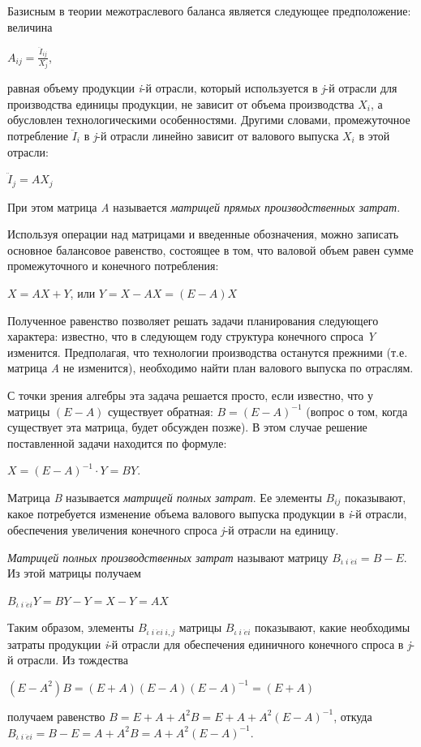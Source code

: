 \documentclass[12pt, 4paper]{book}
\begin{document}
{Базисным в теории межотраслевого баланса является следующее предположение: величина
\begin{center}
	$A_{ij} = \frac{\ddot{I}_{ij}}{X_j}$,
\end{center}
равная объему продукции \textit{i}-й отрасли, который используется в \textit{j}-й отрасли для производства единицы продукции, не зависит от объема производства $X_i$, а обусловлен технологическими особенностями. Другими словами, промежуточное потребление $\ddot{I}_i$ в \textit{j}-й отрасли линейно зависит от валового выпуска $X_i$ в этой отрасли:
\begin{center}
	$\ddot{I}_j = AX_j$
\end{center}
При этом матрица \textit{A} называется \textit{матрицей прямых производственных затрат}.
\par

Используя операции над матрицами и введенные обозначения, можно записать основное балансовое равенство, состоящее в том, что валовой объем равен сумме промежуточного и конечного потребления:
\begin{center}
	$X = AX + Y$, или $Y = X - AX = (E - A)X$
\end{center}
Полученное равенство позволяет решать задачи планирования следующего характера: известно, что в следующем году структура конечного спроса \textit{Y} изменится. Предполагая, что технологии производства останутся прежними (т.е. матрица \textit{A} не изменится), необходимо найти план валового выпуска по отраслям.
\par

С точки зрения алгебры эта задача решается просто, если известно, что у матрицы $(E - A)$ существует обратная: $B = (E - A)^{-1}$ (вопрос о том, когда существует эта матрица, будет обсужден позже). В этом случае решение поставленной задачи находится по формуле:
\begin{center}
	$X = (E - A)^{-1} \cdot Y = BY$.
\end{center}
Матрица \textit{B} называется \textit{матрицей полных затрат}. Ее элементы $B_{ij}$ показывают, какое потребуется изменение объема валового выпуска продукции в \textit{i}-й отрасли, обеспечения увеличения конечного спроса \textit{j}-й отрасли на единицу.  
\par

\textit{Матрицей полных производственных затрат} называют матрицу $B_{\ddot{\iota} \; i \; \ddot{e}i} = B - E$. Из этой матрицы получаем
\begin{center}
	$B_{\ddot{\iota} \; i \; \ddot{e}i}Y = BY - Y = X - Y = AX$
\end{center}
Таким образом, элементы $B_{\ddot{\iota} \; i \; \ddot{e}i \; i,j}$ матрицы $B_{\ddot{\iota} \; i \; \ddot{e}i}$ показывают, какие необходимы затраты продукции \textit{i}-й отрасли для обеспечения единичного конечного спроса в \textit{j}-й отрасли.
Из тождества
\begin{center}
		$(E-A^2)B=(E+A)(E-A)(E-A)^{-1}=(E+A)$
\end{center}                     
получаем равенство
$B=E+A+A^2B=E+A+A^2(E-A)^{-1}$,
откуда
$B_{\ddot{\iota} \; i \; \ddot{e}i} = B-E = A + A^2B = A+A^2(E-A)^{-1}$.
\par
	
}
\end{document}
